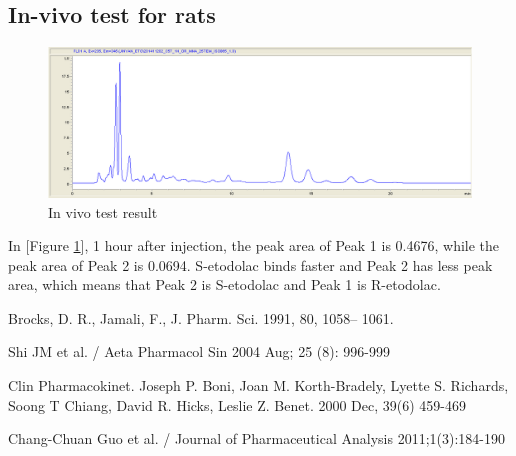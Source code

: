 \documentclass[12pt]{article} %
\begin{document}
\subsection {In-vivo test for rats}

\begin{figure}[h!]
  \centering
  \includegraphics[width=\linewidth]{f9.png}
  \caption{In vivo test result}
  \label{fig:fig8}
\end{figure}

 In [Figure \ref{fig:fig8}],  1 hour after injection, the peak area of Peak 1 is 0.4676, while the peak area of Peak 2 is 0.0694. S-etodolac binds faster\cite{cite2} and Peak 2 has less peak area, which means that Peak 2 is S-etodolac and Peak 1 is R-etodolac.



\newpage

\begin{thebibliography}{100}
	Brocks, D. R., Jamali, F., J. Pharm. Sci. 1991, 80, 1058– 1061.


        Shi JM et al. / Aeta Pharmacol Sin 2004 Aug; 25 (8): 996-999

        Clin Pharmacokinet. Joseph P. Boni, Joan M. Korth-Bradely, Lyette S. Richards, Soong T Chiang, David R. Hicks, Leslie Z. Benet. 2000 Dec, 39(6) 459-469

	Chang-Chuan Guo et al. / Journal of Pharmaceutical Analysis  2011;1(3):184-190

\end{thebibliography}
\end{document}
